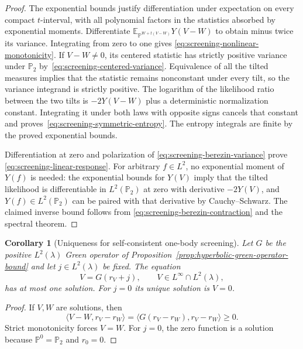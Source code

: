 \documentclass[11pt,a4paper]{article}
\numberwithin{equation}{section}
\newtheorem{corollary}[theorem]{Corollary}
\theoremstyle{definition}
\theoremstyle{remark}
\begin{document}
\begin{proof}
The exponential bounds justify differentiation under expectation on
every compact $t$-interval, with all polynomial factors in the
statistics absorbed by exponential moments.  Differentiate
$\mathbb E_{\mathbb P^{W+t(V-W)}}Y(V-W)$ to obtain minus twice its
variance.  Integrating from zero to one gives
\eqref{eq:screening-nonlinear-monotonicity}.  If $V-W\ne0$, its
centered statistic has strictly positive variance under $\mathbb P_2$
by~\eqref{eq:screening-centered-variance}.  Equivalence of all the
tilted measures implies that the statistic remains nonconstant under
every tilt, so the variance integrand is strictly positive.
The logarithm of the likelihood ratio between the two tilts is
$-2Y(V-W)$ plus a deterministic normalization constant.  Integrating
it under both laws with opposite signs cancels that constant and
proves~\eqref{eq:screening-symmetric-entropy}.  The entropy integrals
are finite by the proved exponential bounds.

Differentiation at zero and polarization of
\eqref{eq:screening-berezin-variance} prove
\eqref{eq:screening-linear-response}.  For arbitrary $f\in L^2$,
no exponential moment of $Y(f)$ is needed: the exponential bounds for
$Y(V)$ imply that the tilted likelihood is differentiable in
$L^2(\mathbb P_2)$ at zero with derivative $-2Y(V)$, and
$Y(f)\in L^2(\mathbb P_2)$ can be paired with that derivative by
Cauchy--Schwarz.  The claimed
inverse bound follows from
\eqref{eq:screening-berezin-contraction} and the spectral theorem.
\end{proof}

\begin{corollary}[Uniqueness for self-consistent one-body screening]
\label{cor:screening-one-body-fixedpoint}
Let $G$ be the positive $L^2(\lambda)$ Green operator of
Proposition~\ref{prop:hyperbolic-green-operator-bound} and let
$j\in L^2(\lambda)$ be fixed.  The equation
\begin{equation}
 V=G(r_V+j),\qquad V\in L^\infty\cap L^2(\lambda),
 \label{eq:screening-one-body-fixedpoint}
\end{equation}
has at most one solution.  For $j=0$ its unique solution is $V=0$.
\end{corollary}

\begin{proof}
If $V,W$ are solutions, then
\[
 \langle V-W,r_V-r_W\rangle
 =\langle G(r_V-r_W),r_V-r_W\rangle\ge0.
\]
Strict monotonicity forces $V=W$.  For $j=0$, the zero function is
a solution because $\mathbb P^0=\mathbb P_2$ and $r_0=0$.
\end{proof}
\end{document}
